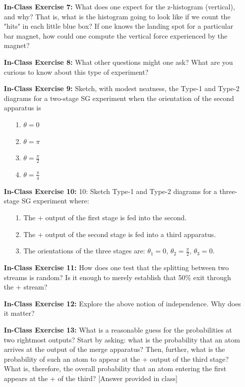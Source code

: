 \documentclass[main.tex]{subfiles}
\begin{document}
\begin{enumerate}
\item[] \textbf{In-Class Exercise 7:} What does one expect for the z-histogram (vertical), and why? That is, what is the histogram going to look like if we count the "hits" in each little blue box? If one knows the landing spot for a particular bar magnet, how could one compute the vertical force experienced by the magnet?

\item[] \textbf{In-Class Exercise 8:} What other questions might one ask? What are you curious to know about this type of experiment?

\item[] \textbf{In-Class Exercise 9:} Sketch, with modest neatness, the Type-1 and Type-2 diagrams for a two-stage SG experiment when the orientation of the second apparatus is

    \begin{enumerate}
        \item[1.] $\theta=0$
        \item[2.] $\theta=\pi$
        \item[3.] $\theta=\frac{\pi}{2}$
        \item[4.] $\theta=\frac{\pi}{4}$
    \end{enumerate}

\item[] \textbf{In-Class Exercise 10:} 10: Sketch Type-1 and Type-2 diagrams for a three-stage SG experiment where:

    \begin{enumerate}
        \item[1.] The + output of the first stage is fed into the second.
        \item[2.] The + output of the second stage is fed into a third apparatus.
        \item[3.] The orientations of the three stages are: $\theta_{1}=0$, $\theta_{2}=\frac{\pi}{2}$, $\theta_{3}=0$.
    \end{enumerate}

\item[] \textbf{In-Class Exercise 11:} How does one test that the splitting between two streams is random? Is it enough to merely establish that 50\% exit through the + stream?

\item[] \textbf{In-Class Exercise 12:} Explore the above notion of independence. Why does it matter?

\item[] \textbf{In-Class Exercise 13:} What is a reasonable guess for the probabilities at two rightmost outputs? Start by asking: what is the probability that an atom arrives at the output of the merge apparatus? Then, further, what is the probability of such an atom to appear at the + output of the third stage? What is, therefore, the overall probability that an atom entering the first appears at the + of the third?
[Answer provided in class]


\end{enumerate}
\end{document}
